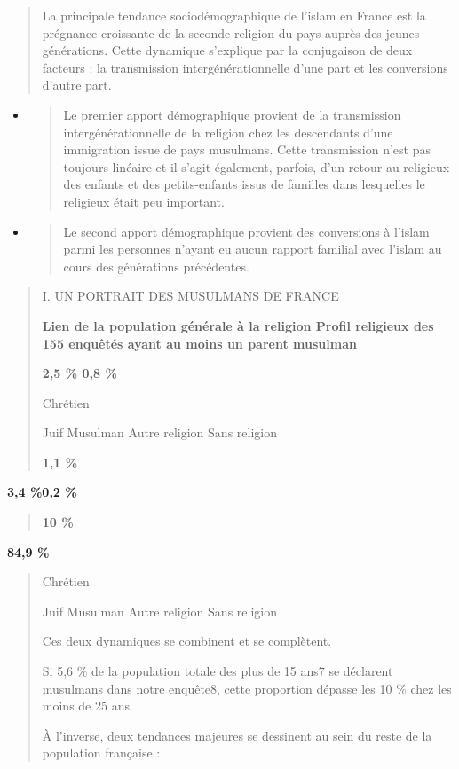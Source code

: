 \begin{quote}
La principale tendance sociodémographique de l'islam en France est la
prégnance croissante de la seconde religion du pays auprès des jeunes
générations. Cette dynamique s'explique par la conjugaison de deux
facteurs : la transmission intergénérationnelle d'une part et les
conversions d'autre part.
\end{quote}

\begin{itemize}
\item
  \begin{quote}
  Le premier apport démographique provient de la transmission
  intergénérationnelle de la religion chez les descendants d'une
  immigration issue de pays musulmans. Cette transmission n'est pas
  toujours linéaire et il s'agit également, parfois, d'un retour au
  religieux des enfants et des petits-enfants issus de familles dans
  lesquelles le religieux était peu important.
  \end{quote}
\item
  \begin{quote}
  Le second apport démographique provient des conversions à l'islam
  parmi les personnes n'ayant eu aucun rapport familial avec l'islam au
  cours des générations précédentes.
  \end{quote}
\end{itemize}

\begin{quote}
I. UN PORTRAIT DES MUSULMANS DE FRANCE

\textbf{Lien de la population générale à la religion Profil religieux
des 155 enquêtés ayant au moins un parent musulman}

\textbf{2,5 \% 0,8 \%}

Chrétien

Juif Musulman Autre religion Sans religion

\textbf{1,1 \%}
\end{quote}

\textbf{3,4 \%0,2 \%}

\begin{quote}
\textbf{10 \%}
\end{quote}

\textbf{84,9 \%}

\begin{quote}
Chrétien

Juif Musulman Autre religion Sans religion

Ces deux dynamiques se combinent et se complètent.

Si 5,6 \% de la population totale des plus de 15 ans7 se déclarent
musulmans dans notre enquête8, cette proportion dépasse les 10 \% chez
les moins de 25 ans.

À l'inverse, deux tendances majeures se dessinent au sein du reste de la
population française :
\end{quote}

